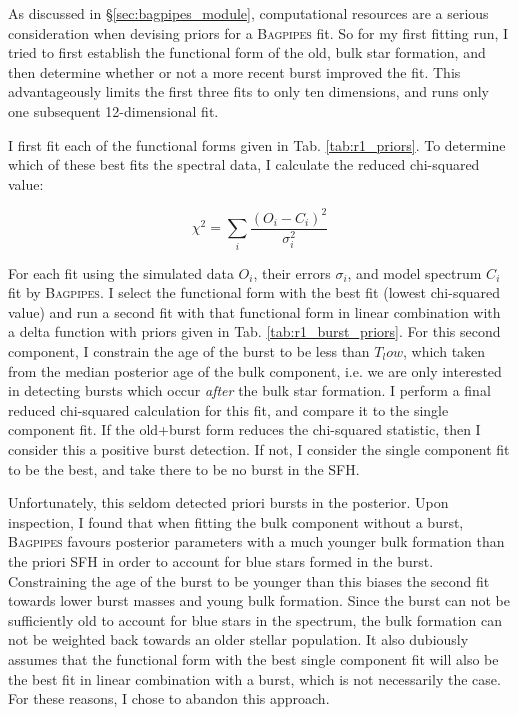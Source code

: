 \documentclass[a4paper,11pt]{article}
\begin{document}
As discussed in \S \ref{sec:bagpipes_module}, computational resources are a serious consideration when devising priors for a \textsc{Bagpipes} fit. So for my first fitting run, I tried to first establish the functional form of the old, bulk star formation, and then determine whether or not a more recent burst improved the fit. This advantageously limits the first three fits to only ten dimensions, and runs only one subsequent 12-dimensional fit.

I first fit each of the functional forms given in Tab. \ref{tab:r1_priors}. To determine which of these best fits the spectral data, I calculate the reduced chi-squared value:

\begin{equation}
  \chi^2 = \sum_{i}\frac{(O_i - C_i)^2}{\sigma_i^2}
\end{equation}

\noindent For each fit using the simulated data $O_i$, their errors $\sigma_i$, and model spectrum $C_i$ fit by \textsc{Bagpipes}. I select the functional form with the best fit (lowest chi-squared value) and run a second fit with that functional form in linear combination with a delta function with priors given in Tab. \ref{tab:r1_burst_priors}. For this second component, I constrain the age of the burst to be less than $T_low$, which taken from the median posterior age of the bulk component, i.e. we are only interested in detecting bursts which occur \textit{after} the bulk star formation. I perform a final reduced chi-squared calculation for this fit, and compare it to the single component fit. If the old+burst form reduces the chi-squared statistic, then I consider this a positive burst detection. If not, I consider the single component fit to be the best, and take there to be no burst in the SFH.

Unfortunately, this seldom detected priori bursts in the posterior. Upon inspection, I found that when fitting the bulk component without a burst, \textsc{Bagpipes} favours posterior parameters with a much younger bulk formation than the priori SFH in order to account for blue stars formed in the burst. Constraining the age of the burst to be younger than this biases the second fit towards lower burst masses and young bulk formation. Since the burst can not be sufficiently old to account for blue stars in the spectrum, the bulk formation can not be weighted back towards an older stellar population. It also dubiously assumes that the functional form with the best single component fit will also be the best fit in linear combination with a burst, which is not necessarily the case. For these reasons, I chose to abandon this approach.
\end{document}
